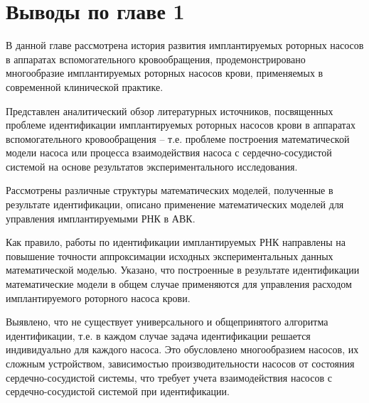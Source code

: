 \section*{Выводы по главе 1} 

В данной главе рассмотрена история развития имплантируемых роторных насосов в аппаратах вспомогательного кровообращения, продемонстрировано многообразие имплантируемых роторных насосов крови, применяемых в современной клинической практике. 

Представлен аналитический обзор литературных источников, посвященных проблеме идентификации имплантируемых роторных насосов крови в аппаратах вспомогательного кровообращения -- т.\:е. проблеме построения математической модели насоса или процесса взаимодействия насоса с сердечно-сосудистой системой на основе результатов экспериментального исследования.

Рассмотрены различные структуры математических моделей, полученные в результате идентификации, описано применение математических моделей для управления имплантируемыми РНК в АВК. 

Как правило, работы по идентификации имплантируемых РНК направлены на повышение точности аппроксимации исходных экспериментальных данных математической моделью. Указано, что построенные в результате идентификации математические модели в общем случае применяются для управления расходом имплантируемого роторного насоса крови. 

Выявлено, что не существует универсального и общепринятого алгоритма идентификации, т.\:е. в каждом случае задача идентификации решается индивидуально для каждого насоса. Это обусловлено многообразием насосов, их сложным устройством, зависимостью производительности насосов от состояния сердечно-сосудистой системы, что требует учета взаимодействия насосов с сердечно-сосудистой системой при идентификации.


